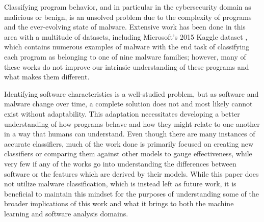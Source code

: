 Classifying program behavior, and in particular in the cybersecurity domain as malicious or benign, is an unsolved problem due to the complexity of programs and the ever-evolving state of malware. Extensive work has been done in this area with a multitude of datasets, including Microsoft's 2015 Kaggle dataset \cite{kaggle}, which contains numerous examples of malware with the end task of classifying each program as belonging to one of nine malware families; however, many of these works do not improve our intrinsic understanding of these programs and what makes them different.

Identifying software characteristics is a well-studied problem, but as software and malware change over time, a complete solution does not and most likely cannot exist without adaptability. This adaptation necessitates developing a better understanding of how programs behave and how they might relate to one another in a way that humans can understand. Even though there are many instances of accurate classifiers, much of the work done is primarily focused on creating new classifiers or comparing them against other models to gauge effectiveness, while very few if any of the works go into understanding the differences between software or the features which are derived by their models. While this paper does not utilize malware classification, which is instead left as future work, it is beneficial to maintain this mindset for the purposes of understanding some of the broader implications of this work and what it brings to both the machine learning and software analysis domains.